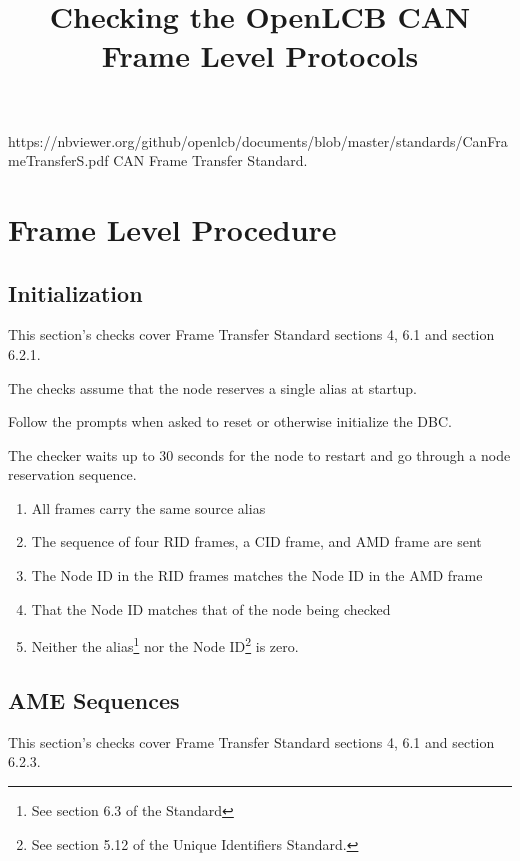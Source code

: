 

\title{Checking the OpenLCB CAN Frame Level Protocols}


\maketitle


\introductionCaveats
    {https://nbviewer.org/github/openlcb/documents/blob/master/standards/CanFrameTransferS.pdf}
    {CAN Frame Transfer Standard}.

\section{Frame Level Procedure}


\subsection{Initialization}

This section's checks cover Frame Transfer Standard sections 4, 6.1 and section 6.2.1.

The checks assume that the node reserves a single alias at startup.

Follow the prompts when asked to reset or otherwise initialize the DBC.

The checker waits up to 30 seconds for the node to restart and 
go through a node reservation sequence.

\begin{enumerate}
\item All frames carry the same source alias
\item The sequence of four RID frames, a CID frame, and AMD frame are sent
\item The Node ID in the RID frames matches the Node ID in the AMD frame
\item That the Node ID matches that of the node being checked
\item Neither the alias\footnote{See section 6.3 of the Standard} 
nor the Node ID\footnote{See section 5.12 of the Unique Identifiers Standard.}
is zero.
\end{enumerate}


\subsection{AME Sequences}

This section's checks cover Frame Transfer Standard sections 4, 6.1 and section 6.2.3.

